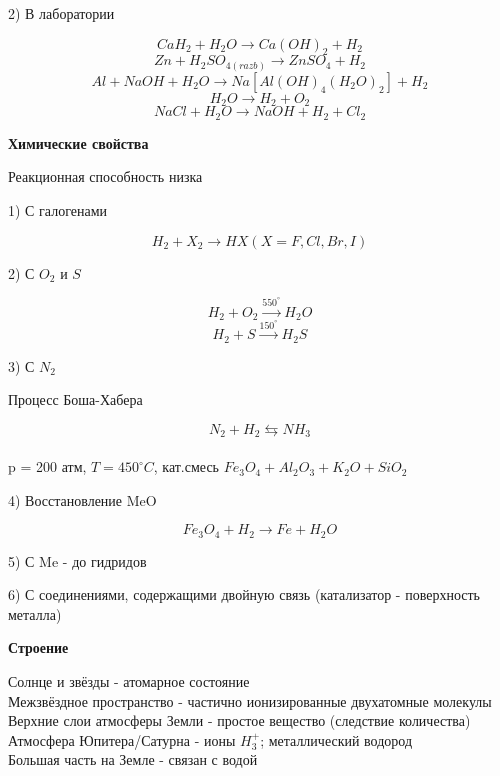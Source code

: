 \documentclass[14pt,a4paper]{scrartcl}
\begin{document}
2) В лаборатории

$$CaH_2 + H_2O \rightarrow Ca(OH)_2 + H_2$$
$$Zn + H_2SO_{4(razb)} \rightarrow ZnSO_4 + H_2$$
$$Al + NaOH + H_2O \rightarrow Na[Al(OH)_4(H_2O)_2] + H_2$$
$$H_2O \rightarrow H_2 + O_2$$
$$NaCl + H_2O \rightarrow NaOH + H_2 + Cl_2$$

\textbf{Химические свойства}

Реакционная способность низка

1) С галогенами

$$H_2 + X_2 \rightarrow HX(X = F, Cl, Br, I)$$

2) С $O_2$ и $S$

$$H_2 + O_2 \xrightarrow{550^{\circ}} H_2O$$
$$H_2 + S \xrightarrow{150^{\circ}} H_2S$$

3) С $N_2$

Процесс Боша-Хабера

$$N_2 + H_2 \leftrightarrows NH_3$$\\
p = 200 атм, $T = 450^{\circ}C$, кат.смесь $Fe_3O_4 + Al_2O_3 + K_2O + SiO_2$

4) Восстановление MeO

$$Fe_3O_4  + H_2 \rightarrow Fe + H_2O$$

5) С Me - до гидридов

6) С соединениями, содержащими двойную связь (катализатор - поверхность металла)

\textbf{Строение}

Солнце и звёзды - атомарное состояние\\
Межзвёздное пространство - частично ионизированные двухатомные молекулы\\
Верхние слои атмосферы Земли - простое вещество (следствие количества)\\
Атмосфера Юпитера/Сатурна - ионы $H_3^+$; металлический водород\\
Большая часть на Земле - связан с водой
\end{document}

